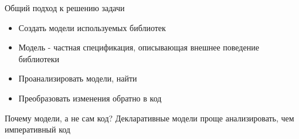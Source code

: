 \documentclass[12pt]{beamer}
\begin{document}
{
\begin{frame}{Общий подход к решению задачи}
\begin{mybox}[]
\begin{itemize}
	\item Создать модели используемых библиотек
	\item Модель - частная спецификация, описывающая внешнее поведение библиотеки
	\item Проанализировать модели, найти 
	\item Преобразовать изменения обратно в код
\end{itemize}
\end{mybox}

\begin{alertblock}{Почему модели, а не сам код?}
Декларативные модели проще анализировать, чем императивный код
\end{alertblock}
\end{frame}
}
\end{document}
